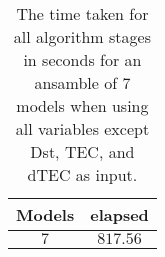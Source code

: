 \begin{table}[!ht]
	\centering
	\begin{tabular}{|c|c|}
		\hline
		Models & elapsed \\ \hline
		$7$ & $817.56$ \\ \hline
	\end{tabular}
	\caption{The time taken for all algorithm stages in seconds for an ansamble of 7 models when using all variables except Dst, TEC, and dTEC as input.}
	\label{tab:time:ansamble:noTEC:7}
\end{table}

